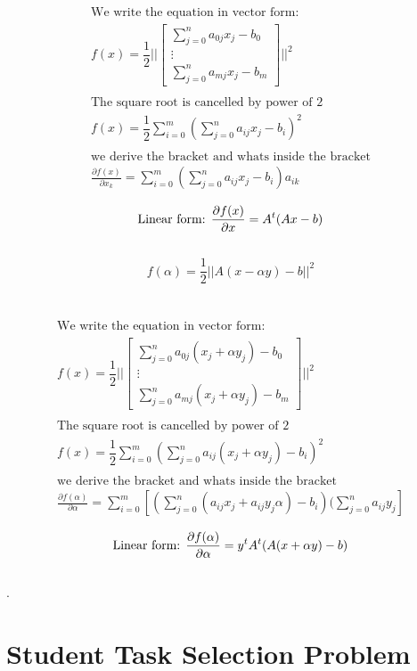 \documentclass[12pt]{article}         %
\begin{document}
$$
\begin{aligned}
\text{We write the equation in vector form:}\\
f(x) = \dfrac{1}{2}||
  \begin{bmatrix}
 \sum_{j=0}^{n}a_{0j}x_j - b_0\\
\vdots\\
  \sum_{j=0}^{n}a_{mj}x_j - b_m
   \end{bmatrix}
||^2\\\\
\text{The square root is cancelled by power of 2}\\
f(x) = \dfrac{1}{2}\sum_{i=0}^{m}(\sum_{j=0}^{n}a_{ij}x_j - b_i)^2\\\\
\text{we derive the bracket and whats inside the bracket}\\
\frac {\partial f(x)}{\partial x_k} = \sum_{i=0}^{m}(\sum_{j=0}^{n}a_{ij}x_j - b_i)a_{ik}\\
\end{aligned}
$$
$$
\text{Linear form: }\\
	\frac {\partial f(x)}{\partial x}  = A^t(Ax - b)
$$\\
\begin{equation}
	f(\alpha) = \dfrac{1}{2}||A(x - \alpha y) - b||^2
\end{equation}
\\
\\
$$
\begin{aligned}
\text{We write the equation in vector form:}\\
f(x) = \dfrac{1}{2}||
  \begin{bmatrix}
 \sum_{j=0}^{n}a_{0j}(x_j + \alpha y_j) - b_0\\
\vdots\\
  \sum_{j=0}^{n}a_{mj}(x_j + \alpha y_j) - b_m
   \end{bmatrix}
||^2\\\\
\text{The square root is cancelled by power of 2}\\
f(x) = \dfrac{1}{2}\sum_{i=0}^{m}(\sum_{j=0}^{n}a_{ij}(x_j + \alpha y_j) - b_i)^2\\\\
\text{we derive the bracket and whats inside the bracket}\\
\frac {\partial f(\alpha)}{\partial \alpha} = \sum_{i=0}^{m}[ ( \sum_{j=0}^{n}(a_{ij}x_j +a_{ij}y_j\alpha) - b_i)(\sum_{j=0}^{n}a_{ij}y_j]\\
\end{aligned}
$$
$$
\text{Linear form: }\\
	\frac {\partial f(\alpha)}{\partial \alpha} = y^tA^t(A(x +\alpha y) - b)
$$\\

	.


\section{Student Task Selection Problem}
\end{document}
